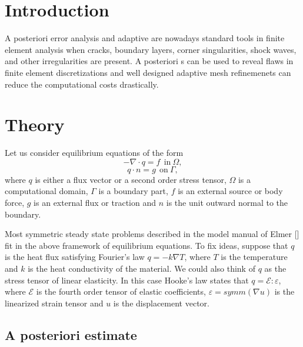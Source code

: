 
\noindent
\begin{versiona}

\section{Introduction}

A posteriori error analysis and adaptive  are nowadays
standard tools in finite element analysis when cracks, boundary layers,
corner singularities, shock waves, and other irregularities are present.
A posteriori s can be used to reveal flaws in finite
element discretizations and well designed adaptive mesh refinemenets
can reduce the computational costs drastically.

\section{Theory}

Let us consider equilibrium equations of the form
\begin{equation}
-\nabla \cdot q = f \ \ \mathrm{in} \ \Omega, \label{equilibrium}
\end{equation}
\begin{equation}
q \cdot n = g \ \ \mathrm{on} \ \Gamma, \label{boundarycondition}
\end{equation}
where $q$ is either a flux vector or a second order stress tensor, $\Omega$
is a computational domain, $\Gamma$ is a boundary part, $f$ is an external
source or body force, $g$ is an external flux or traction and $n$ is the
unit outward normal to the boundary.

Most symmetric steady state problems described in the model manual of
Elmer [] fit in the above framework of equilibrium equations. To fix
ideas, suppose that $q$ is the heat flux satisfying Fourier's law
$q=-k \nabla T$, where $T$ is the temperature and $k$ is the heat
conductivity of the material. We could also think of $q$ as the stress
tensor of linear elasticity. In this case Hooke's law states that 
$q = \mathcal{E} : \varepsilon$, where $\mathcal E$ is the fourth order
tensor of elastic coefficients, $\varepsilon = symm(\nabla u)$ is the 
linearized strain tensor and $u$ is the displacement vector.

\subsection{A posteriori estimate}


\end{versiona}
